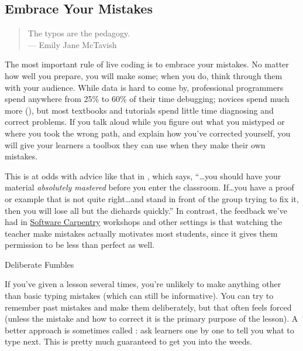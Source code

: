 \subsection*{Embrace Your Mistakes}

\begin{quote}

  The typos are the pedagogy.\\
  --- Emily Jane McTavish

\end{quote}

The most important rule of live coding is to embrace your mistakes.
No matter how well you prepare, you will make some; when you do, think
through them with your audience.  While data is hard to come by,
professional programmers spend anywhere from 25\% to 60\% of their
time debugging; novices spend much more (), but
most textbooks and tutorials spend little time diagnosing and correct
problems.  If you talk aloud while you figure out what you mistyped or
where you took the wrong path, and explain how you've corrected
yourself, you will give your learners a toolbox they can use when they
make their own mistakes.

This is at odds with advice like that in \cite{Kran2015}, which says,
``{\ldots}you should have your material \emph{absolutely mastered}
before you enter the classroom. If{\ldots}you have a proof or example
that is not quite right{\ldots}and stand in front of the group trying
to fix it, then you will lose all but the diehards quickly.''  In
contrast, the feedback we've had in
\href{http://software-carpentry.org}{Software Carpentry} workshops and
other settings is that watching the teacher make mistakes actually
motivates most students, since it gives them permission to be less
than perfect as well.

\begin{callout}{Deliberate Fumbles}

  If you've given a lesson several times, you're unlikely to make
  anything other than basic typing mistakes (which can still be
  informative). You can try to remember past mistakes and make them
  deliberately, but that often feels forced (unless the mistake and
  how to correct it is the primary purpose of the lesson).  A better
  approach is sometimes called : ask learners one by one to tell you what to type next.
  This is pretty much guaranteed to get you into the weeds.

\end{callout}

